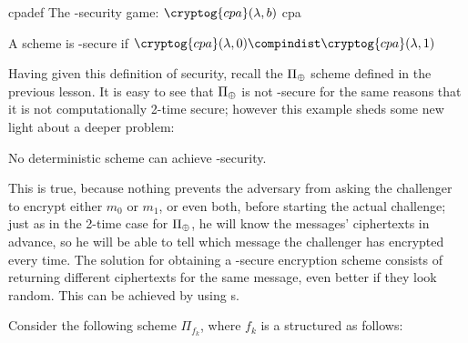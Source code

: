 \begin{cryptogame}
    {cpadef}
    {The \cpa-security game: $\cryptog{cpa}(\lambda, b)$}
    {cpa}


    \cseqbeginloop
    \cseqendloop

    \cseqdelay


    \cseqdelay

    \cseqbeginloop
    \cseqendloop

    \cseqdelay


\end{cryptogame}

\begin{definition}
    A scheme is \cpa-secure if $\cryptog{cpa}(\lambda, 0) \compindist \cryptog{cpa}(\lambda, 1)$
\end{definition}


Having given this definition of security, recall the $\Pi_\oplus$ scheme defined in the previous lesson. It is easy to see that $\Pi_\oplus$ is not \cpa-secure for the same reasons that it is not computationally 2-time secure; however this example sheds some new light about a deeper problem:

\begin{observation}
    No deterministic scheme can achieve \cpa-security.
\end{observation}

This is true, because nothing prevents the adversary from asking the challenger to encrypt either $m_0$ or $m_1$, or even both, before starting the actual challenge; just as in the 2-time case for $\Pi_\oplus$, he will know the messages' ciphertexts in advance, so he will be able to tell which message the challenger has encrypted every time. The solution for obtaining a \cpa-secure encryption scheme consists of returning different ciphertexts for the same message, even better if they look random. This can be achieved by using \prf{}s.

Consider the following \ske{} scheme $\Pi_{f_k}$, where $f_k$ is a \prf{} structured as follows:

